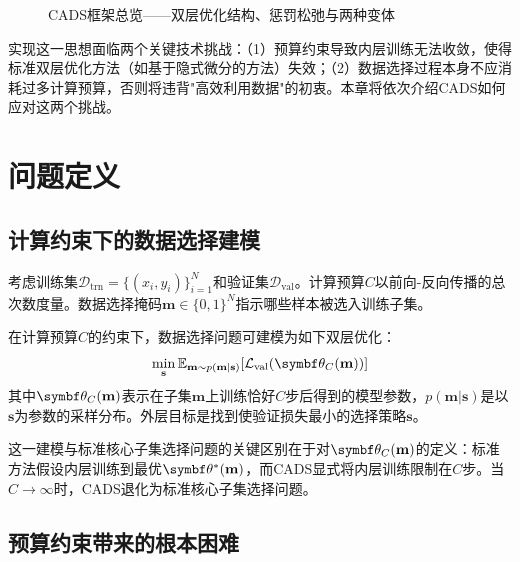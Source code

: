 \begin{figure}[htb]
  \centering
  \caption{CADS框架总览——双层优化结构、惩罚松弛与两种变体}
  \label{fig:cads-framework}
\end{figure}

实现这一思想面临两个关键技术挑战：（1）预算约束导致内层训练无法收敛，使得标准双层优化方法（如基于隐式微分的方法）失效；（2）数据选择过程本身不应消耗过多计算预算，否则将违背"高效利用数据"的初衷。本章将依次介绍CADS如何应对这两个挑战。


\section{问题定义}

\subsection{计算约束下的数据选择建模}

考虑训练集$\mathcal{D}_{\text{trn}} = \{(x_i, y_i)\}_{i=1}^{N}$和验证集$\mathcal{D}_{\text{val}}$。计算预算$C$以前向-反向传播的总次数度量。数据选择掩码$\mathbf{m} \in \{0,1\}^N$指示哪些样本被选入训练子集。

在计算预算$C$的约束下，数据选择问题可建模为如下双层优化：
\begin{equation}\label{eq:cads-bilevel}
  \min_{\mathbf{s}} \mathbb{E}_{\mathbf{m} \sim p(\mathbf{m}|\mathbf{s})}[\Lval(\btheta_C(\mathbf{m}))]
\end{equation}
其中$\btheta_C(\mathbf{m})$表示在子集$\mathbf{m}$上训练恰好$C$步后得到的模型参数，$p(\mathbf{m}|\mathbf{s})$是以$\mathbf{s}$为参数的采样分布。外层目标是找到使验证损失最小的选择策略$\mathbf{s}$。

这一建模与标准核心子集选择问题\cite{zhou2022probabilistic}的关键区别在于对$\btheta_C(\mathbf{m})$的定义：标准方法假设内层训练到最优$\btheta^*(\mathbf{m})$，而CADS显式将内层训练限制在$C$步。当$C \to \infty$时，CADS退化为标准核心子集选择问题。

\subsection{预算约束带来的根本困难}

